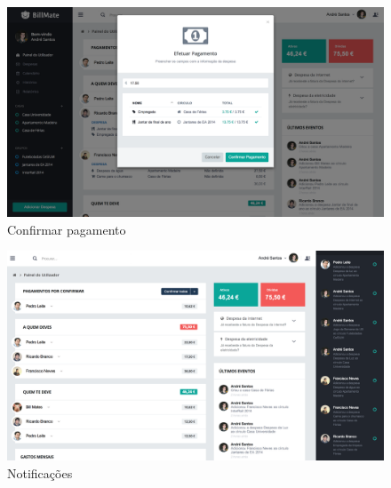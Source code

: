 \begin{figure}[H]
{
\includegraphics[width=.5\textwidth]{images/andre/payment}
\caption{Confirmar pagamento}
}
\end{figure}

\begin{figure}[H]
{
\includegraphics[width=.5\textwidth]{images/andre/notifications}
\caption{Notificações}
}
\end{figure}

